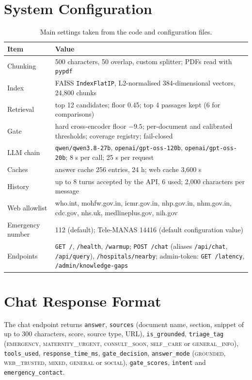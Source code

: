 \documentclass[10pt,a4paper]{article}
\newcommand{\code}[1]{\texttt{\small #1}}
\begin{document}
\section{System Configuration}\label{app:config}
\begin{table}[h]
\centering\small
\caption{Main settings taken from the code and configuration files.}
\begin{tabular}{p{4cm}p{10.5cm}}
\toprule
Item & Value\\
\midrule
Chunking & 500 characters, 50 overlap, custom splitter; PDFs read with \code{pypdf}\\
Index & FAISS \code{IndexFlatIP}, L2-normalised 384-dimensional vectors, 24,800 chunks\\
Retrieval & top 12 candidates; floor 0.45; top 4 passages kept (6 for comparisons)\\
Gate & hard cross-encoder floor $-9.5$; per-document and calibrated thresholds; coverage registry; fail-closed\\
LLM chain & \code{qwen/qwen3.8-27b}, \code{openai/gpt-oss-120b}, \code{openai/gpt-oss-20b}; 8 s per call; 25 s per request\\
Caches & answer cache 256 entries, 24 h; web cache 3,600 s\\
History & up to 8 turns accepted by the API, 6 used; 2,000 characters per message\\
Web allowlist & who.int, mohfw.gov.in, icmr.gov.in, nhp.gov.in, nhm.gov.in, cdc.gov, nhs.uk, medlineplus.gov, nih.gov\\
Emergency number & 112 (default); Tele-MANAS 14416 (default configuration value)\\
Endpoints & \code{GET /}, \code{/health}, \code{/warmup}; \code{POST /chat} (aliases \code{/api/chat}, \code{/api/query}), \code{/hospitals/nearby}; admin-token: \code{GET /latency}, \code{/admin/knowledge-gaps}\\
\bottomrule
\end{tabular}
\end{table}

\section{Chat Response Format}
The chat endpoint returns \code{answer}, \code{sources} (document name, section, snippet of up to 300 characters, score, source type, URL), \code{is\_grounded}, \code{triage\_tag} (\textsc{emergency}, \textsc{maternity\_urgent}, \textsc{consult\_soon}, \textsc{self\_care} or \textsc{general\_info}), \code{tools\_used}, \code{response\_time\_ms}, \code{gate\_decision}, \code{answer\_mode} (\textsc{grounded}, \textsc{web\_trusted}, \textsc{mixed}, \textsc{general} or \textsc{social}), \code{gate\_scores}, \code{intent} and \code{emergency\_contact}.
\end{document}
